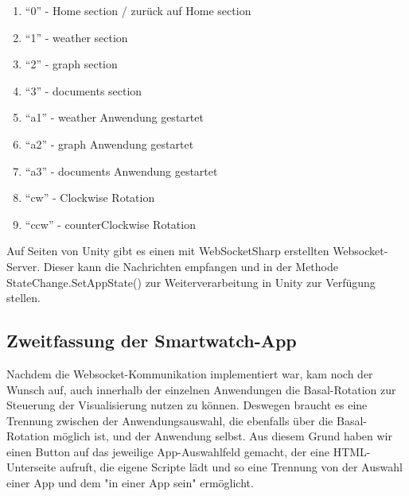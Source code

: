 \documentclass[11pt, a4paper]{article}
\begin{document}
\begin{enumerate}
	\item{“0” - Home section / zurück auf Home section}	
	\item{“1” - weather section}
	\item{“2” - graph section}
	\item{“3” - documents section}
	\item{“a1” - weather Anwendung gestartet}
	\item{“a2” - graph Anwendung gestartet}
	\item{“a3” - documents Anwendung gestartet}
	\item{“cw” - Clockwise Rotation}
	\item{“ccw” - counterClockwise Rotation}
\end{enumerate}

Auf Seiten von Unity gibt es einen mit WebSocketSharp erstellten Websocket-Server. Dieser kann die Nachrichten empfangen und in der Methode StateChange.SetAppState() zur Weiterverarbeitung in Unity zur Verfügung stellen. 

\subsection{Zweitfassung der Smartwatch-App}

Nachdem die Websocket-Kommunikation implementiert war, kam noch der Wunsch auf, auch innerhalb der einzelnen Anwendungen die Basal-Rotation zur Steuerung der Visualisierung nutzen zu können. Deswegen braucht es eine Trennung zwischen der Anwendungsauswahl, die ebenfalls über die Basal-Rotation möglich ist, und der Anwendung selbst. Aus diesem Grund haben wir einen Button auf das jeweilige App-Auswahlfeld gemacht, der eine HTML-Unterseite aufruft, die eigene Scripte lädt und so eine Trennung von der Auswahl einer App und dem "in einer App sein" ermöglicht. 
\end{document}

